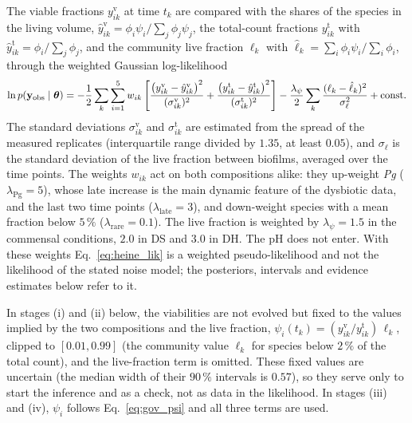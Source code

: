 The viable fractions $y^{\mathrm{v}}_{ik}$ at time $t_k$ are compared with the
shares of the species in the living volume, $\hat y^{\mathrm{v}}_{ik}=\phi_i\psi_i/\sum_j\phi_j\psi_j$,
the total-count fractions $y^{\mathrm{t}}_{ik}$ with
$\hat y^{\mathrm{t}}_{ik}=\phi_i/\sum_j\phi_j$, and the community live fraction
$\ell_k$ with $\hat\ell_k=\sum_i\phi_i\psi_i/\sum_i\phi_i$, through the weighted
Gaussian log-likelihood
\begin{equation}
  \ln p(\mathbf{y}_{\mathrm{obs}}\mid\boldsymbol{\theta})
  =-\frac12\sum_{k}\sum_{i=1}^{5}w_{ik}\left[
  \frac{\bigl(y^{\mathrm{v}}_{ik}-\hat y^{\mathrm{v}}_{ik}\bigr)^2}{(\sigma^{\mathrm{v}}_{ik})^2}
  +\frac{\bigl(y^{\mathrm{t}}_{ik}-\hat y^{\mathrm{t}}_{ik}\bigr)^2}{(\sigma^{\mathrm{t}}_{ik})^2}\right]
  -\frac{\lambda_\psi}{2}\sum_k\frac{(\ell_k-\hat\ell_k)^2}{\sigma_\ell^2}
  +\mathrm{const}.
  \label{eq:heine_lik}
\end{equation}
The standard deviations $\sigma^{\mathrm{v}}_{ik}$ and $\sigma^{\mathrm{t}}_{ik}$ are
estimated from the spread of the measured replicates (interquartile range divided
by $1.35$, at least $0.05$), and $\sigma_\ell$ is the standard deviation of the
live fraction between biofilms, averaged over the time points. The weights
$w_{ik}$ act on both compositions alike: they up-weight \textit{Pg}
($\lambda_{\mathrm{Pg}}=5$), whose late increase is the main dynamic feature of the
dysbiotic data, and the last two time points ($\lambda_{\mathrm{late}}=3$), and
down-weight species with a mean fraction below $5\,\%$ ($\lambda_{\mathrm{rare}}=0.1$).
The live fraction is weighted by $\lambda_\psi=1.5$ in the commensal conditions,
$2.0$ in DS and $3.0$ in DH. The pH does not enter. With these weights
Eq.~\eqref{eq:heine_lik} is a weighted pseudo-likelihood and not the likelihood
of the stated noise model; the posteriors, intervals and evidence estimates
below refer to it.

In stages (i) and (ii) below, the viabilities are not evolved but fixed to the
values implied by the two compositions and the live fraction,
$\psi_i(t_k)=(y^{\mathrm{v}}_{ik}/y^{\mathrm{t}}_{ik})\,\ell_k$, clipped to
$[0.01,0.99]$ (the community value $\ell_k$ for species below $2\,\%$ of the total
count), and the live-fraction term is omitted. These fixed values are uncertain
(the median width of their $90\,\%$ intervals is $0.57$), so they serve only to
start the inference and as a check, not as data in the likelihood. In stages
(iii) and (iv), $\psi_i$ follows Eq.~\eqref{eq:gov_psi} and all three terms are
used.

